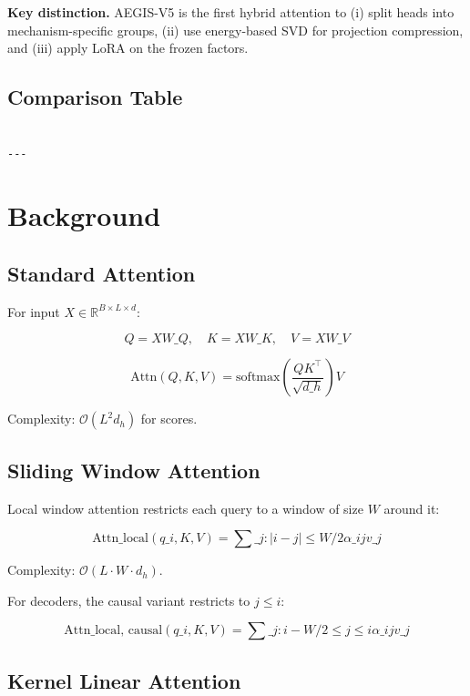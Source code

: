 \textbf{Key distinction.} AEGIS-V5 is the first hybrid attention to (i) split 
heads into mechanism-specific groups, (ii) use energy-based SVD for 
projection compression, and (iii) apply LoRA on the frozen factors.



\subsection{Comparison Table}

\begin{lstlisting}

---
\end{lstlisting}

\section{Background}

\subsection{Standard Attention}

For input $X \in \mathbb{R}^{B \times L \times d}$:

\[
Q = X W\_Q, \quad K = X W\_K, \quad V = X W\_V
\]

\[
\text{Attn}(Q, K, V) = \text{softmax}\!\left(\frac{Q K^\top}{\sqrt{d\_h}}\right) V
\]

Complexity: $\mathcal{O}(L^2 d_h)$ for scores.

\subsection{Sliding Window Attention}

Local window attention restricts each query to a window of size $W$ around 
it:

\[
\text{Attn}\_\text{local}(q\_i, K, V) = \sum\_{j : |i - j| \leq W/2} \alpha\_{ij} v\_j
\]

Complexity: $\mathcal{O}(L \cdot W \cdot d_h)$.

For decoders, the causal variant restricts to $j \leq i$:

\[
\text{Attn}\_\text{local, causal}(q\_i, K, V) = \sum\_{j : i - W/2 \leq j \leq i} \alpha\_{ij} v\_j
\]

\subsection{Kernel Linear Attention}

